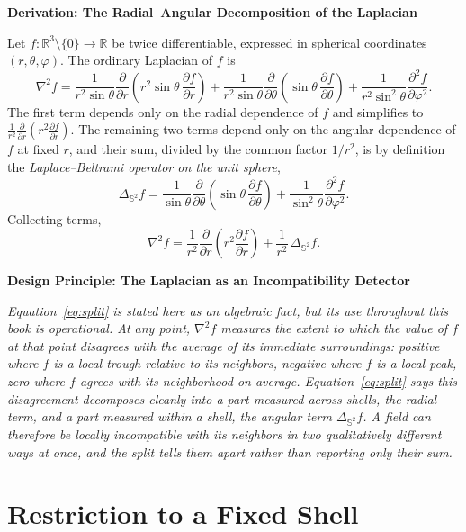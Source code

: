 \documentclass[11pt,fleqn]{book}
\numberwithin{equation}{chapter}
\newenvironment{principle}[1]
  {\begin{principleEnv}
   \noindent\textbf{Design Principle: #1}\par\smallskip\itshape}
  {\end{principleEnv}}
\newenvironment{derivation}[1]
  {\begin{derivationEnv}
   \noindent\textbf{Derivation: #1}\par\smallskip}
  {\end{derivationEnv}}
\theoremstyle{plain}
\theoremstyle{definition}
\theoremstyle{remark}
\newcommand{\Sphere}{\mathbb{S}^{2}}
\newcommand{\R}{\mathbb{R}}
\begin{document}
\begin{derivation}{The Radial--Angular Decomposition of the Laplacian}
Let \(f:\R^3\setminus\{0\}\to\R\) be twice differentiable, expressed in spherical coordinates \((r,\theta,\varphi)\). The ordinary Laplacian of \(f\) is
\[
\nabla^2 f = \frac{1}{r^2\sin\theta}\frac{\partial}{\partial r}\!\left(r^2\sin\theta\,\frac{\partial f}{\partial r}\right)
+ \frac{1}{r^2\sin\theta}\frac{\partial}{\partial\theta}\!\left(\sin\theta\,\frac{\partial f}{\partial\theta}\right)
+ \frac{1}{r^2\sin^2\theta}\frac{\partial^2 f}{\partial\varphi^2}.
\]
The first term depends only on the radial dependence of \(f\) and simplifies to \(\frac{1}{r^2}\frac{\partial}{\partial r}\!\left(r^2\frac{\partial f}{\partial r}\right)\). The remaining two terms depend only on the angular dependence of \(f\) at fixed \(r\), and their sum, divided by the common factor \(1/r^2\), is by definition the \emph{Laplace--Beltrami operator on the unit sphere},
\[
\Delta_{\Sphere} f = \frac{1}{\sin\theta}\frac{\partial}{\partial\theta}\!\left(\sin\theta\,\frac{\partial f}{\partial\theta}\right) + \frac{1}{\sin^2\theta}\frac{\partial^2 f}{\partial\varphi^2}.
\]
Collecting terms,
\begin{equation}
\nabla^2 f = \frac{1}{r^2}\frac{\partial}{\partial r}\!\left(r^2\frac{\partial f}{\partial r}\right) + \frac{1}{r^2}\,\Delta_{\Sphere} f.
\label{eq:split}
\end{equation}
\end{derivation}

\begin{principle}{The Laplacian as an Incompatibility Detector}
Equation~\eqref{eq:split} is stated here as an algebraic fact, but its use throughout this book is operational. At any point, \(\nabla^2 f\) measures the extent to which the value of \(f\) at that point disagrees with the average of its immediate surroundings: positive where \(f\) is a local trough relative to its neighbors, negative where \(f\) is a local peak, zero where \(f\) agrees with its neighborhood on average. Equation~\eqref{eq:split} says this disagreement decomposes cleanly into a part measured across shells, the radial term, and a part measured within a shell, the angular term \(\Delta_{\Sphere}f\). A field can therefore be locally incompatible with its neighbors in two qualitatively different ways at once, and the split tells them apart rather than reporting only their sum.
\end{principle}

\section{Restriction to a Fixed Shell}
\end{document}
